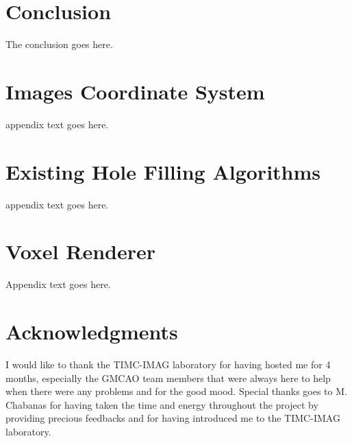 \documentclass[12pt,journal,compsoc]{IEEEtran}
\begin{document}
\section{Conclusion}
The conclusion goes here.



\appendices
\section{Images Coordinate System}
appendix text goes here.

\section{Existing Hole Filling Algorithms}
appendix text goes here.

\section{Voxel Renderer}
Appendix text goes here.

\section*{Acknowledgments}
I would like to thank the TIMC-IMAG laboratory for having hosted me for 4 months, especially the GMCAO team members that were always here to help when there were any problems and for the good mood. Special thanks goes to M. Chabanas for having taken the time and energy throughout the project by providing precious feedbacks and for having introduced me to the TIMC-IMAG laboratory.

\ifCLASSOPTIONcaptionsoff
  \newpage
\fi






% 
\end{document}
